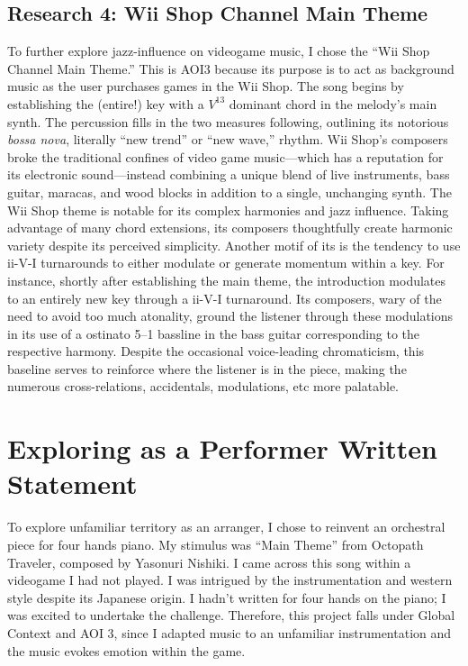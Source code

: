 \documentclass[11pt,a4paper]{article}
\begin{document}
\subsection{Research 4: Wii Shop Channel Main Theme}

To further explore jazz-influence on videogame music, I chose the “Wii Shop Channel Main Theme.” This is AOI3 because its purpose is to act as background music as the user purchases games in the Wii Shop.
    The song begins by establishing the (entire!) key with a $V^{13}$ dominant chord in the melody’s main synth. The percussion fills in the two measures following, outlining its notorious \textit{bossa nova}, literally “new trend” or “new wave,” rhythm. Wii Shop’s composers broke the traditional confines of video game music---which has a reputation for its electronic sound---instead combining a unique blend of live instruments, bass guitar, maracas, and wood blocks in addition to a single, unchanging synth.
    The Wii Shop theme is notable for its complex harmonies and jazz influence. Taking advantage of many chord extensions, its composers thoughtfully create harmonic variety despite its perceived simplicity. Another motif of its is the tendency to use ii-V-I turnarounds to either modulate or generate momentum within a key. For instance, shortly after establishing the main theme, the introduction modulates to an entirely new key through a ii-V-I turnaround. Its composers, wary of the need to avoid too much atonality, ground the listener through these modulations in its use of a ostinato 5--1 bassline in the bass guitar corresponding to the respective harmony. Despite the occasional voice-leading chromaticism, this baseline serves to reinforce where the listener is in the piece, making the numerous cross-relations, accidentals, modulations, etc more palatable.\autocite{wiishop}
    
\section{Exploring as a Performer Written Statement}

To explore unfamiliar territory as an arranger, I chose to reinvent an orchestral piece for four hands piano. My stimulus was “Main Theme” from Octopath Traveler, composed by Yasonuri Nishiki. I came across this song within a videogame I had not played. I was intrigued by the instrumentation and western style despite its Japanese origin. I hadn’t written for four hands on the piano; I was excited to undertake the challenge. Therefore, this project falls under Global Context and AOI 3, since I adapted music to an unfamiliar instrumentation and the music evokes emotion within the game. 
\end{document}
